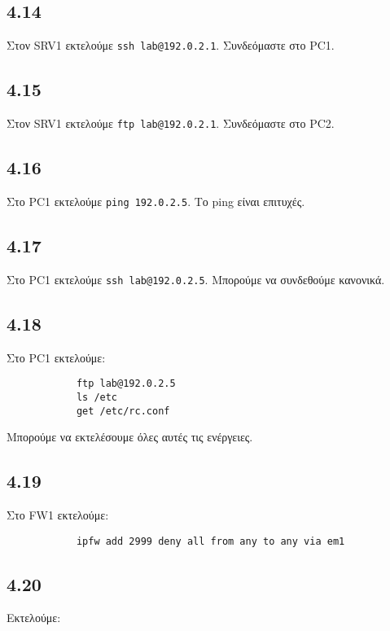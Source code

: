 \documentclass[a4paper, 12pt]{article}
\begin{document}
	\subsection*{4.14}
		Στον SRV1 εκτελούμε \verb|ssh lab@192.0.2.1|. Συνδεόμαστε στο PC1.

	\subsection*{4.15}
		Στον SRV1 εκτελούμε \verb|ftp lab@192.0.2.1|. Συνδεόμαστε στο PC2.

	\subsection*{4.16}
		Στο PC1 εκτελούμε \verb|ping 192.0.2.5|. Το ping είναι επιτυχές.

	\subsection*{4.17}
		Στο PC1 εκτελούμε \verb|ssh lab@192.0.2.5|. Μπορούμε να συνδεθούμε κανονικά.

	\subsection*{4.18}
		Στο PC1 εκτελούμε:
		
		\begin{verbatim}
			ftp lab@192.0.2.5
			ls /etc
			get /etc/rc.conf
		\end{verbatim}
		
		Μπορούμε να εκτελέσουμε όλες αυτές τις ενέργειες.

	\subsection*{4.19}
		Στο FW1 εκτελούμε:
		
		\begin{verbatim}
			ipfw add 2999 deny all from any to any via em1
		\end{verbatim}

	\subsection*{4.20} 
		Εκτελούμε:
		
\end{document}
